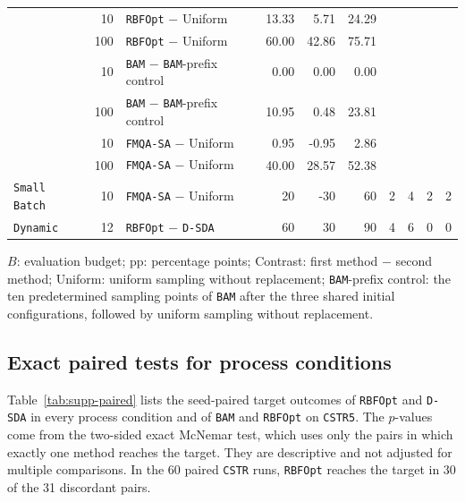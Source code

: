 \begin{table}[htbp]
\begin{threeparttable}
\begin{tabular}{@{}lrlrrrrrrr@{}}
 & 10 & \texttt{RBFOpt} \(-\) Uniform & 13.33 & 5.71 & 24.29 & & & & \\
 & 100 & \texttt{RBFOpt} \(-\) Uniform & 60.00 & 42.86 & 75.71 & & & & \\
 & 10 & \texttt{BAM} \(-\) \texttt{BAM}-prefix control & 0.00 & 0.00 & 0.00 & & & & \\
 & 100 & \texttt{BAM} \(-\) \texttt{BAM}-prefix control & 10.95 & 0.48 & 23.81 & & & & \\
 & 10 & \texttt{FMQA-SA} \(-\) Uniform & 0.95 & -0.95 & 2.86 & & & & \\
 & 100 & \texttt{FMQA-SA} \(-\) Uniform & 40.00 & 28.57 & 52.38 & & & & \\
\midrule
\texttt{Small Batch} & 10 & \texttt{FMQA-SA} \(-\) Uniform & 20 & -30 & 60 & 2 & 4 & 2 & 2 \\
\midrule
\texttt{Dynamic} & 12 & \texttt{RBFOpt} \(-\) \texttt{D-SDA} & 60 & 30 & 90 & 4 & 6 & 0 & 0 \\
\bottomrule
\end{tabular}
\begin{tablenotes}[flushleft]\footnotesize
\item \(B\): evaluation budget; pp: percentage points; Contrast: first method \(-\) second method; Uniform: uniform sampling without replacement; \texttt{BAM}-prefix control: the ten predetermined sampling points of \texttt{BAM} after the three shared initial configurations, followed by uniform sampling without replacement.
\end{tablenotes}
\end{threeparttable}
\end{table}
\FloatBarrier

\subsection{Exact paired tests for process conditions}
Table~\ref{tab:supp-paired} lists the seed-paired target outcomes of \texttt{RBFOpt} and \texttt{D-SDA} in every process condition and of \texttt{BAM} and \texttt{RBFOpt} on \texttt{CSTR5}.
The \(p\)-values come from the two-sided exact McNemar test, which uses only the pairs in which exactly one method reaches the target.
They are descriptive and not adjusted for multiple comparisons.
In the 60 paired \texttt{CSTR} runs, \texttt{RBFOpt} reaches the target in 30 of the 31 discordant pairs.

